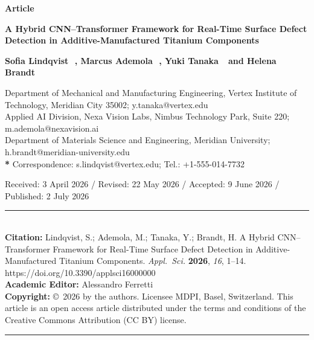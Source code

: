 \documentclass[10pt,a4paper]{article}
\begin{document}
\noindent{}
\vspace{0.8em}




\begin{center}
\vspace*{4pt}
{\small\bfseries\color{mdpiteal} Article}\par
\vspace{10pt}
{\LARGE\bfseries\color{mdpiblue}
A Hybrid CNN--Transformer Framework for Real-Time Surface Defect Detection in Additive-Manufactured Titanium Components}\par
\vspace{16pt}
{\large\bfseries
Sofia Lindqvist~\,,
Marcus Ademola~\,,
Yuki Tanaka~\ and
Helena Brandt~}\par
\vspace{10pt}
{\small\color{mdpigray}
 Department of Mechanical and Manufacturing Engineering, Vertex Institute of Technology, Meridian City 35002; y.tanaka@vertex.edu\\
 Applied AI Division, Nexa Vision Labs, Nimbus Technology Park, Suite 220; m.ademola@nexavision.ai\\
 Department of Materials Science and Engineering, Meridian University; h.brandt@meridian-university.edu\\[2pt]
\textbf{*} Correspondence: s.lindqvist@vertex.edu; Tel.: +1-555-014-7732}\par
\vspace{10pt}
{\small\color{mdpigray} Received: 3 April 2026 / Revised: 22 May 2026 / Accepted: 9 June 2026 / Published: 2 July 2026}
\end{center}

\vspace{6pt}
{\footnotesize\color{mdpigray}
\noindent\rule{\linewidth}{0.6pt}\\[4pt]
\textbf{Citation:} Lindqvist, S.; Ademola, M.; Tanaka, Y.; Brandt, H. A Hybrid CNN--Transformer Framework for Real-Time Surface Defect Detection in Additive-Manufactured Titanium Components. \textit{Appl.\ Sci.} \textbf{2026}, \textit{16}, 1--14. https://doi.org/10.3390/applsci16000000\\
\textbf{Academic Editor:} Alessandro Ferretti\\
\textbf{Copyright:} \copyright\ 2026 by the authors. Licensee MDPI, Basel, Switzerland. This article is an open access article distributed under the terms and conditions of the Creative Commons Attribution (CC BY) license.\\
\noindent\rule{\linewidth}{0.6pt}}
\end{document}

